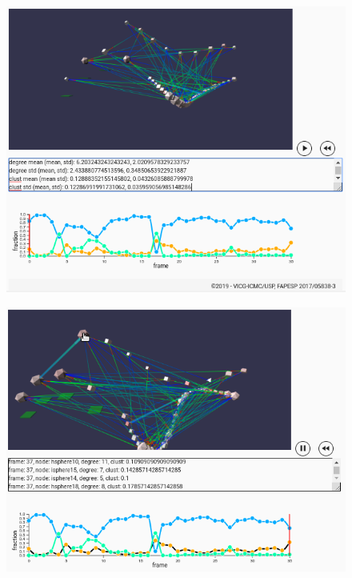 \documentclass[runningheads]{llncs}
\begin{document}
\begin{figure}[!h]\centering
\includegraphics[width=\textwidth]{esfNetVis2___}
  \caption{
  }\label{esfnetvis}
\end{figure}

\begin{figure}[!h]\centering
\includegraphics[width=\textwidth]{esfNetVis3}
  \caption{
  }\label{esfnetvis}
\end{figure}
\end{document}

